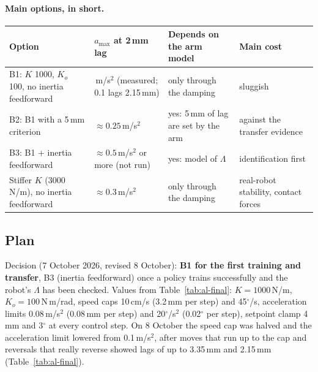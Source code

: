 \paragraph{Main options, in short.}
\begin{center}
{\renewcommand{\arraystretch}{1.2}
\begin{tabular}{>{\raggedright\arraybackslash}p{}>{\raggedright\arraybackslash}p{}>{\raggedright\arraybackslash}p{}>{\raggedright\arraybackslash}p{}}
  \toprule
  Option & $a_\text{max}$ at 2\,mm lag & Depends on the arm model & Main cost \\
  \midrule
  B1: $K$ 1000, $K_o$ 100, no inertia feedforward & 0.08\,m/s$^2$ (measured; 0.1 lags 2.15\,mm) & only through the
    damping & sluggish \\
  \addlinespace
  B2: B1 with a 5\,mm criterion & $\approx 0.25$\,m/s$^2$ & yes: 5\,mm of lag are set by the arm & against the transfer
    evidence \\
  \addlinespace
  B3: B1 + inertia feedforward & $\approx 0.5$\,m/s$^2$ or more (not run) & yes: model of $\Lambda$ & identification
    first \\
  \addlinespace
  Stiffer $K$ (3000\,N/m), no inertia feedforward & $\approx 0.3$\,m/s$^2$ & only through the damping & real-robot
    stability, contact forces \\
  \bottomrule
\end{tabular}}
\end{center}

\subsection{Plan}
\label{sec:al-plan}
Decision (7 October 2026, revised 8 October): \textbf{B1 for the first training and transfer}, B3 (inertia
feedforward) once a policy trains successfully and the robot's $\Lambda$ has been checked. Values from
Table~\ref{tab:al-final}: $K = 1000$\,N/m, $K_o = 100$\,N\,m/rad, speed caps 10\,cm/s (3.2\,mm per step) and
45$^\circ$/s, acceleration limits 0.08\,m/s$^2$ (0.08\,mm per step) and 20$^\circ$/s$^2$ (0.02$^\circ$ per step),
setpoint clamp 4\,mm and 3$^\circ$ at every control step. On 8 October the speed cap was halved and the acceleration
limit lowered from 0.1\,m/s$^2$, after moves that run up to the cap and reversals that really reverse showed lags of
up to 3.35\,mm and 2.15\,mm (Table~\ref{tab:al-final}).

